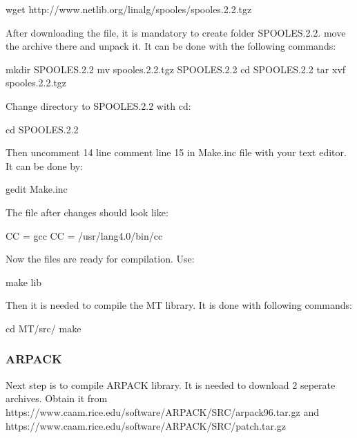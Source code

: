 \documentclass[letterpaper,10pt,english]{sphinxmanual}
\begin{document}
\begin{sphinxVerbatim}[commandchars=\\\{\}]
wget http://www.netlib.org/linalg/spooles/spooles.2.2.tgz
\end{sphinxVerbatim}

After downloading the file, it is mandatory to create folder SPOOLES.2.2. move the archive there and unpack it. It can be done with the following commands:

\begin{sphinxVerbatim}[commandchars=\\\{\}]
mkdir SPOOLES.2.2
mv spooles.2.2.tgz SPOOLES.2.2
cd SPOOLES.2.2
tar xvf spooles.2.2.tgz
\end{sphinxVerbatim}

Change directory to SPOOLES.2.2 with cd:

\begin{sphinxVerbatim}[commandchars=\\\{\}]
cd SPOOLES.2.2
\end{sphinxVerbatim}

Then  uncomment 14 line comment line 15 in Make.inc file with your text editor. It can be done by:

\begin{sphinxVerbatim}[commandchars=\\\{\}]
gedit Make.inc
\end{sphinxVerbatim}

The file after changes should look like:

\begin{sphinxVerbatim}[commandchars=\\\{\}]
CC = gcc
\PYGZsh{}  CC = /usr/lang\PYGZhy{}4.0/bin/cc
\end{sphinxVerbatim}

Now the files are ready for compilation. Use:

\begin{sphinxVerbatim}[commandchars=\\\{\}]
make lib  
\end{sphinxVerbatim}

Then it is needed to compile the MT library. It is done with following commands:

\begin{sphinxVerbatim}[commandchars=\\\{\}]
cd MT/src/
make   
\end{sphinxVerbatim}


\subsubsection{ARPACK}
\label{\detokenize{software_setup/calculix:arpack}}
Next step is to compile ARPACK library. It is needed to download 2 seperate archives. Obtain it from https://www.caam.rice.edu/software/ARPACK/SRC/arpack96.tar.gz and https://www.caam.rice.edu/software/ARPACK/SRC/patch.tar.gz
\end{document}
